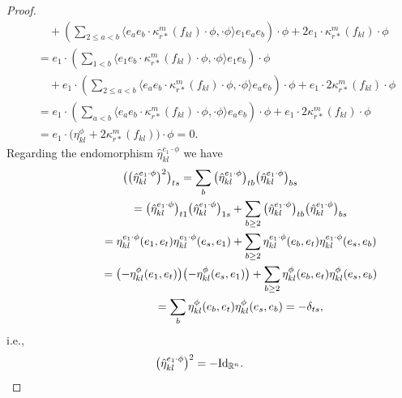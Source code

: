 \documentclass[pdftex]{sigma}
\numberwithin{equation}{section}
\begin{document}
\begin{proof}
\begin{gather*}
 \qquad{} +\left(\sum_{2\leq a<b} \big\langle e_ae_b\cdot\kappa_{r*}^m(f_{kl})\cdot\phi,\cdot\phi\big\rangle e_1e_ae_b\right)\cdot\phi
 + 2e_1\cdot\kappa_{r*}^m(f_{kl})\cdot\phi\\
 \quad{} = e_1\cdot\left(\sum_{1<b} \big\langle e_1e_b\cdot\kappa_{r*}^m(f_{kl})\cdot\phi,\cdot\phi\big\rangle e_1e_b\right)\cdot\phi\\
 \qquad{} +e_1\cdot\left(\sum_{2\leq a<b} \big\langle e_ae_b\cdot\kappa_{r*}^m(f_{kl})\cdot\phi,\cdot\phi\big\rangle e_ae_b\right)\cdot\phi
 + e_1\cdot 2\kappa_{r*}^m(f_{kl})\cdot\phi\\
 \quad{}= e_1\cdot\left(\sum_{a<b} \big\langle e_ae_b\cdot\kappa_{r*}^m(f_{kl})\cdot\phi,\cdot\phi\big\rangle e_ae_b\right)\cdot\phi
 +e_1\cdot 2\kappa_{r*}^m(f_{kl})\cdot\phi\\
\quad{} = e_1\cdot\big(\eta_{kl}^{\phi} +2\kappa_{r*}^m(f_{kl})\big)\cdot\phi = 0.
\end{gather*}
Regarding the endomorphism $\hat\eta_{kl}^{e_1\cdot\phi}$ we have
\begin{gather*}
\big(\big(\hat\eta_{kl}^{e_1\cdot\phi}\big)^2\big)_{ts} =\sum_{b}\big(\hat\eta_{kl}^{e_1\cdot\phi}\big)_{tb}\big(\hat\eta_{kl}^{e_1\cdot\phi}\big)_{bs}\\
\hphantom{\big(\big(\hat\eta_{kl}^{e_1\cdot\phi}\big)^2\big)_{ts}}{}
=\big(\hat\eta_{kl}^{e_1\cdot\phi}\big)_{t1}\big(\hat\eta_{kl}^{e_1\cdot\phi}\big)_{1s}
 +\sum_{b\geq2}\big(\hat\eta_{kl}^{e_1\cdot\phi}\big)_{tb}\big(\hat\eta_{kl}^{e_1\cdot\phi}\big)_{bs}\\
\hphantom{\big(\big(\hat\eta_{kl}^{e_1\cdot\phi}\big)^2\big)_{ts}}{} =\eta_{kl}^{e_1\cdot\phi}(e_1,e_t)\eta_{kl}^{e_1\cdot\phi}(e_s,e_1)
 +\sum_{b\geq2}\eta_{kl}^{e_1\cdot\phi}(e_b,e_t)\eta_{kl}^{e_1\cdot\phi}(e_s,e_b)\\
\hphantom{\big(\big(\hat\eta_{kl}^{e_1\cdot\phi}\big)^2\big)_{ts}}{} =\big({-}\eta_{kl}^{\phi}(e_1,e_t)\big)\big({-}\eta_{kl}^{\phi}(e_s,e_1)\big)
 +\sum_{b\geq2}\eta_{kl}^{\phi}(e_b,e_t)\eta_{kl}^{\phi}(e_s,e_b)\\
\hphantom{\big(\big(\hat\eta_{kl}^{e_1\cdot\phi}\big)^2\big)_{ts}}{} =\sum_{b}\eta_{kl}^{\phi}(e_b,e_t)\eta_{kl}^{\phi}(e_s,e_b) =-\delta_{ts},
\end{gather*}
i.e.,
\begin{gather*}\big(\hat\eta_{kl}^{e_1\cdot\phi}\big)^2=-{\rm Id}_{\mathbb{R}^n}.\tag*{\qed}\end{gather*}\renewcommand{\qed}{}
\end{proof}
\end{document}
